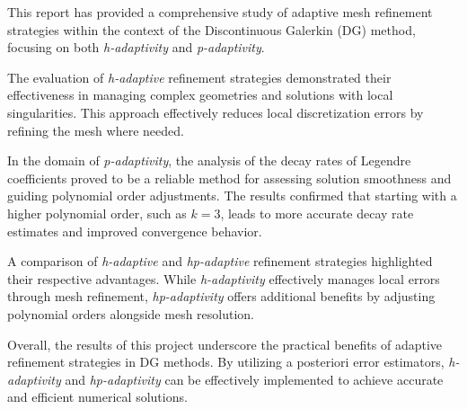 This report has provided a comprehensive study of adaptive mesh refinement strategies within the context of the Discontinuous Galerkin (DG) method, focusing on both \textit{h-adaptivity} and \textit{p-adaptivity}.

The evaluation of \textit{h-adaptive} refinement strategies demonstrated their effectiveness in managing complex geometries and solutions with local singularities. This approach effectively reduces local discretization errors by refining the mesh where needed.

In the domain of \textit{p-adaptivity}, the analysis of the decay rates of Legendre coefficients proved to be a reliable method for assessing solution smoothness and guiding polynomial order adjustments. The results confirmed that starting with a higher polynomial order, such as $k = 3$, leads to more accurate decay rate estimates and improved convergence behavior.

A comparison of \textit{h-adaptive} and \textit{hp-adaptive} refinement strategies highlighted their respective advantages. While \textit{h-adaptivity} effectively manages local errors through mesh refinement, \textit{hp-adaptivity} offers additional benefits by adjusting polynomial orders alongside mesh resolution.

Overall, the results of this project underscore the practical benefits of adaptive refinement strategies in DG methods. By utilizing a posteriori error estimators, \textit{h-adaptivity} and \textit{hp-adaptivity} can be effectively implemented to achieve accurate and efficient numerical solutions.